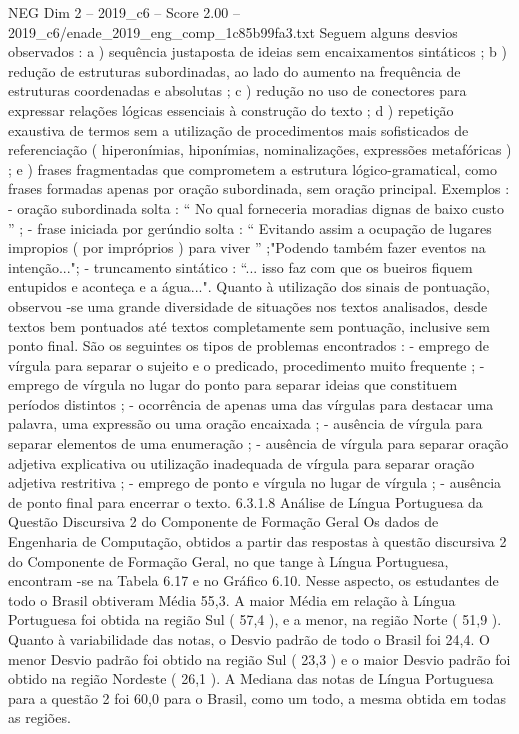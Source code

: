 \begin{textsample}{NEG Dim 2 – 2019\_c6 – Score 2.00 – 2019\_c6/enade\_2019\_eng\_comp\_1c85b99fa3.txt}
Seguem alguns desvios observados : a ) sequência justaposta de ideias sem encaixamentos sintáticos ; b ) redução de estruturas subordinadas, ao lado do aumento na frequência de estruturas coordenadas e absolutas ; c ) redução no uso de conectores para expressar relações lógicas essenciais à construção do texto ; d ) repetição exaustiva de termos sem a utilização de procedimentos mais sofisticados de referenciação ( hiperonímias, hiponímias, nominalizações, expressões metafóricas ) ; e ) frases fragmentadas que comprometem a estrutura lógico-gramatical, como frases formadas apenas por oração subordinada, sem oração principal.
Exemplos : - oração subordinada solta : “ No qual forneceria moradias dignas de baixo custo ” ; - frase iniciada por gerúndio solta : “ Evitando assim a ocupação de lugares impropios ( por impróprios ) para viver ” ;"Podendo também fazer eventos na intenção..."; - truncamento sintático : “... isso faz com que os bueiros fiquem entupidos e aconteça e a água...".
Quanto à utilização dos sinais de pontuação, observou -se uma grande diversidade de situações nos textos analisados, desde textos bem pontuados até textos completamente sem pontuação, inclusive sem ponto final.
São os seguintes os tipos de problemas encontrados : - emprego de vírgula para separar o sujeito e o predicado, procedimento muito frequente ; - emprego de vírgula no lugar do ponto para separar ideias que constituem períodos distintos ; - ocorrência de apenas uma das vírgulas para destacar uma palavra, uma expressão ou uma oração encaixada ; - ausência de vírgula para separar elementos de uma enumeração ; - ausência de vírgula para separar oração adjetiva explicativa ou utilização inadequada de vírgula para separar oração adjetiva restritiva ; - emprego de ponto e vírgula no lugar de vírgula ; - ausência de ponto final para encerrar o texto. 6.3.1.8 Análise de Língua Portuguesa da Questão Discursiva 2 do Componente de Formação Geral Os dados de Engenharia de Computação, obtidos a partir das respostas à questão discursiva 2 do Componente de Formação Geral, no que tange à Língua Portuguesa, encontram -se na Tabela 6.17 e no Gráfico 6.10.
Nesse aspecto, os estudantes de todo o Brasil obtiveram Média 55,3.
A maior Média em relação à Língua Portuguesa foi obtida na região Sul ( 57,4 ), e a menor, na região Norte ( 51,9 ).
Quanto à variabilidade das notas, o Desvio padrão de todo o Brasil foi 24,4.
O menor Desvio padrão foi obtido na região Sul ( 23,3 ) e o maior Desvio padrão foi obtido na região Nordeste ( 26,1 ).
A Mediana das notas de Língua Portuguesa para a questão 2 foi 60,0 para o Brasil, como um todo, a mesma obtida em todas as regiões.

\end{textsample}

